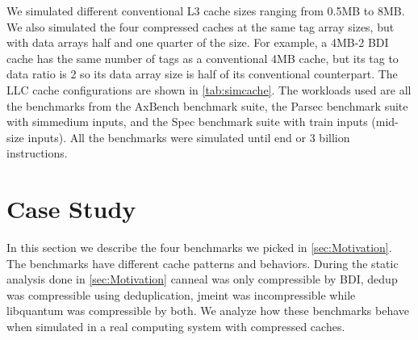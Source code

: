 We simulated different conventional L3 cache sizes ranging from 0.5MB to 8MB. We also simulated the four compressed caches at the same tag array sizes, but with data arrays half and one quarter of the size. For example, a 4MB-2 BDI cache has the same number of tags as a conventional 4MB cache, but its tag to data ratio is 2 so its data array size is half of its conventional counterpart. The LLC cache configurations are shown in \ref{tab:simcache}. The workloads used are all the benchmarks from the AxBench\cite{axbench} benchmark suite, the Parsec\cite{parsec} benchmark suite with simmedium inputs, and the Spec\cite{spec} benchmark suite with train inputs (mid-size inputs). All the benchmarks were simulated until end or 3 billion instructions.

\section{Case Study}
\label{sec:case_study}
In this section we describe the four benchmarks we picked in \ref{sec:Motivation}. The benchmarks have different cache patterns and behaviors. During the static analysis done in \ref{sec:Motivation} canneal was only compressible by BDI, dedup was compressible using deduplication, jmeint was incompressible while libquantum was compressible by both. We analyze how these benchmarks behave when simulated in a real computing system with compressed caches.\par
